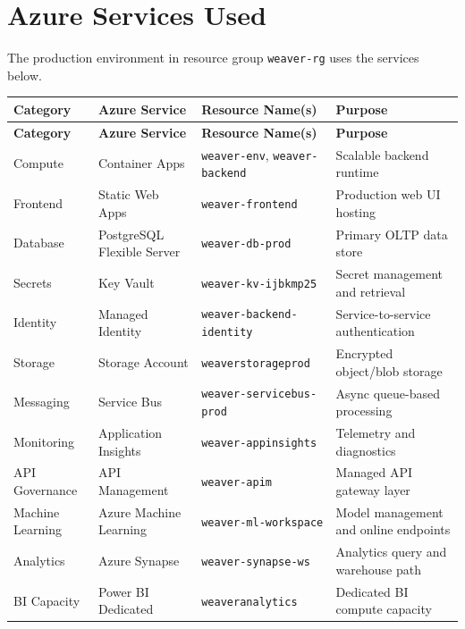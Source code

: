 \documentclass[12pt,a4paper]{article}
\begin{document}
\section{Azure Services Used}

The production environment in resource group \texttt{weaver-rg} uses the services below.

\begin{longtable}{>{\raggedright\arraybackslash}p{3.0cm} >{\raggedright\arraybackslash}p{3.6cm} >{\raggedright\arraybackslash}p{4.2cm} >{\raggedright\arraybackslash}p{4.1cm}}
\toprule
\textbf{Category} & \textbf{Azure Service} & \textbf{Resource Name(s)} & \textbf{Purpose} \\
\midrule
\endfirsthead
\toprule
\textbf{Category} & \textbf{Azure Service} & \textbf{Resource Name(s)} & \textbf{Purpose} \\
\midrule
\endhead
Compute & Container Apps & \texttt{weaver-env}, \texttt{weaver-backend} & Scalable backend runtime \\
Frontend & Static Web Apps & \texttt{weaver-frontend} & Production web UI hosting \\
Database & PostgreSQL Flexible Server & \texttt{weaver-db-prod} & Primary OLTP data store \\
Secrets & Key Vault & \texttt{weaver-kv-ijbkmp25} & Secret management and retrieval \\
Identity & Managed Identity & \texttt{weaver-backend-identity} & Service-to-service authentication \\
Storage & Storage Account & \texttt{weaverstorageprod} & Encrypted object/blob storage \\
Messaging & Service Bus & \texttt{weaver-servicebus-prod} & Async queue-based processing \\
Monitoring & Application Insights & \texttt{weaver-appinsights} & Telemetry and diagnostics \\
API Governance & API Management & \texttt{weaver-apim} & Managed API gateway layer \\
Machine Learning & Azure Machine Learning & \texttt{weaver-ml-workspace} & Model management and online endpoints \\
Analytics & Azure Synapse & \texttt{weaver-synapse-ws} & Analytics query and warehouse path \\
BI Capacity & Power BI Dedicated & \texttt{weaveranalytics} & Dedicated BI compute capacity \\
\bottomrule
\end{longtable}
\end{document}
